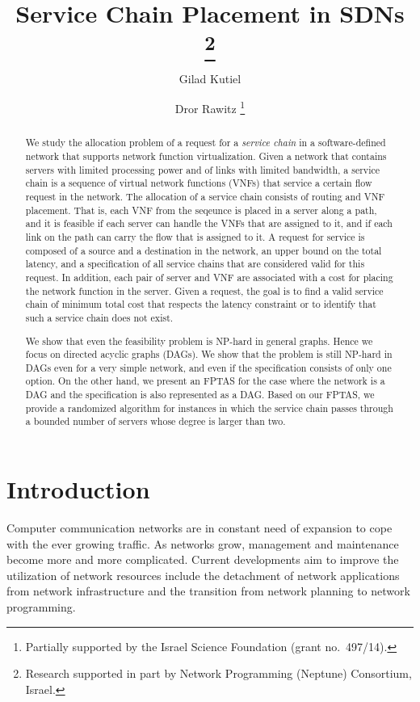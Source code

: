 \documentclass[runningheads]{llncs}
\title{\bf Service Chain Placement in SDNs%
\thanks{Research supported in part by Network Programming (Neptune)
  Consortium, Israel.}
}
\author{%
Gilad Kutiel
\and
Dror Rawitz%
\thanks{Partially supported by the Israel Science Foundation
  (grant no.~497/14).  }
}
\institute{%
Department of Computer Science, Technion, Haifa 32000, Israel. \\
\email{gkutiel@cs.technion.ac.il}
\and
Faculty of Engineering, Bar Ilan University, Ramt-Gan 52900, Israel.\\
\email{dror.rawitz@biu.ac.il}
}
\begin{document}
\maketitle

\begin{abstract}
We study the allocation problem of a request for a \emph{service
chain} in a software-defined network that supports network function
virtualization.
%
Given a network that contains servers with limited processing power
and of links with limited bandwidth, a service chain is a sequence of
virtual network functions (VNFs) that service a certain flow request
in the network.
%
The allocation of a service chain consists of routing and VNF
placement.  That is, each VNF from the seqeunce is placed in a server
along a path, and it is feasible if each server can handle the VNFs
that are assigned to it, and if each link on the path can carry the
flow that is assigned to it.
%
A request for service is composed of a source and a destination in the
network, an upper bound on the total latency, and a specification of
all service chains that are considered valid for this request.
%
In addition, each pair of server and VNF are associated with a cost
for placing the network function in the server.  Given a request, the
goal is to find a valid service chain of minimum total cost that
respects the latency constraint or to identify that such a service
chain does not exist.

We show that even the feasibility problem is NP-hard in general
graphs.  Hence we focus on directed acyclic graphs (DAGs).  We show
that the problem is still NP-hard in DAGs even for a very simple
network, and even if the specification consists of only one option.
%
On the other hand, we present an FPTAS for the case where the network
is a DAG and the specification is also represented as a DAG.  Based on
our FPTAS, we provide a randomized algorithm for instances in which
the service chain passes through a bounded number of servers whose
degree is larger than two.
\end{abstract}


\section{Introduction}


Computer communication networks are in constant need of expansion to
cope with the ever growing traffic.  As networks grow, management and
maintenance become more and more complicated.
%
Current developments aim to improve the utilization of network
resources include the detachment of network applications from network
infrastructure and the transition from network planning to network
programming.
\end{document}
